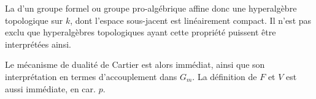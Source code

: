 
La  d'un  groupe formel ou groupe pro-algébrique affine   donc une  hyperalgèbre topologique sur $k$, dont l'espace sous-jacent est linéairement compact. Il n'est pas exclu que  hyperalgèbres topologiques ayant cette propriété  puissent être interprétées ainsi. 

Le mécanisme de dualité de Cartier est alors immédiat, ainsi que son interprétation en termes d'accouplement dans $G_m$. La définition de $F$ et $V$ est aussi immédiate, en car. $p$.

